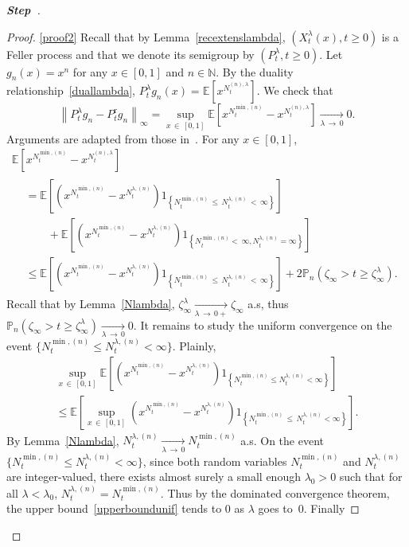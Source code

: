 \documentclass[AHL,Unicode,longabstracts,published]{cedram}
\newcommand{\rmr}{\mathrm{r}}
\newcommand{\bbN}{\mathbb{N}}
\newcommand{\bbE}{\mathbb{E}}
\newcommand{\bbP}{\mathbb{P}}
\newcounter{stepcount}
\newenvironment{step}{\refstepcounter{stepcount}\begin{proof}[\textbf{Step~\thestepcount}]}{\end{proof}}
\begin{document}
\begin{step}
\begin{proof}
\noindent\eqref{proof2} Recall that by Lemma~\ref{recextenslambda}, $(X^{\lambda}_t(x),t\geq 0)$ is a Feller process and that we denote its semigroup by $(P_t^{\lambda},t\geq 0)$. Let $g_n(x)=x^{n}$ for any $x\in [0,1]$ and $n\in \bbN$. By the duality relationship~\eqref{duallambda}, $P_t^{\lambda}g_n(x)=\bbE[x^{N^{(n),\lambda}_{t}}]$. We check that
\begin{equation}\label{unifconvsemigroup}
\left\|P_t^{\lambda}g_n-P_t^{\rmr}g_n\right\|_\infty=\sup_{x\,\in\,[0,1]}\bbE\left[x^{N_t^{\min,(n)}}-x^{N^{(n),\lambda}_{t}}\right]\underset{\lambda\,\rightarrow\,0}{\longrightarrow} 0.
\end{equation}
Arguments are adapted from those in~\cite[Section~7]{zbMATH07055671}. For any $x\in [0,1]$,
\begin{multline*}
\bbE\left[x^{N_t^{\min,(n)}}-x^{N^{(n),\lambda}_t}\right]\\
\begin{aligned}
&=\bbE\left[\left(x^{N^{\min,(n)}_{t}}-x^{N_t^{\lambda,(n)}}\right)1_{\left\{N_t^{\min,(n)}\,\leq\,N_t^{\lambda,(n)}\,<\,\infty\right\}}\right]\\
&\qquad +\bbE\left[\left(x^{N^{\min,(n)}_{t}}-x^{N_t^{\lambda,(n)}}\right)1_{\left\{N_t^{\min,(n)}<\,\infty, N_t^{\lambda,(n)}=\infty\right\}}\right]\\
&\leq \bbE\left[\left(x^{N^{\min,(n)}_{t}}-x^{N_t^{\lambda,(n)}}\right)1_{\left\{N_t^{\min,(n)}\,\leq\,N_t^{\lambda,(n)}\,<\,\infty\right\}}\right]+2\bbP_n\left(\zeta_{\infty}>t\geq \zeta_{\infty}^{\lambda}\right).
\end{aligned}
\end{multline*}
Recall that by Lemma~\ref{Nlambda}, $\zeta_{\infty}^{\lambda}\underset{\lambda\, \rightarrow\,0+}{\longrightarrow} \zeta_{\infty}$ a.s, thus $\bbP_n(\zeta_{\infty}>t\geq \zeta_{\infty}^{\lambda})\underset{\lambda\,\rightarrow\,0}{\longrightarrow} 0$. It remains to study the uniform convergence on the event $\{N_t^{\min,(n)}\leq N_t^{\lambda,(n)}<\infty\}$. Plainly,
\begin{multline}\label{upperboundunif}
\underset{x\,\in\,[0,1]}{\sup} \bbE\left[\left(x^{N^{\min,(n)}_{t}}-x^{N_t^{\lambda,(n)}}\right)1_{\left\{N_t^{\min,(n)}\leq N_t^{\lambda,(n)}<\infty\right\}}\right]\\
\leq \bbE\left[\underset{x\,\in\,[0,1]}{\sup}\left(x^{N^{\min,(n)}_{t}}-x^{N_t^{\lambda,(n)}}\right)1_{\left\{N_t^{\min,(n)}\,\leq\,N_t^{\lambda,(n)}<\infty\right\}}\right].
\end{multline}
By Lemma~\ref{Nlambda}, $N_t^{\lambda,(n)} \underset{\lambda\,\rightarrow\,0}{\longrightarrow} N^{\min,(n)}_t$ a.s. On the event $\{N_t^{\min,(n)}\leq N_t^{\lambda,(n)}<\infty\}$, since both random variables $N_t^{\min,(n)}$ and $N_t^{\lambda,(n)}$ are integer-valued, there exists almost surely a small enough $\lambda_0>0$ such that for all $\lambda<\lambda_0$, $N_t^{\lambda,(n)}=N_t^{\min,(n)}$. Thus by the dominated convergence theorem, the upper bound~\eqref{upperboundunif} tends to $0$ as $\lambda$ goes to~$0$. Finally

\end{proof}
\end{step}
\end{document}
